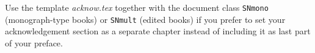 %
%


Use the template \emph{acknow.tex} together with the document class \verb|SNmono| (monograph-type books) or \verb|SNmult| (edited books) if you prefer to set your acknowledgement section as a separate chapter instead of including it as last part of your preface.
